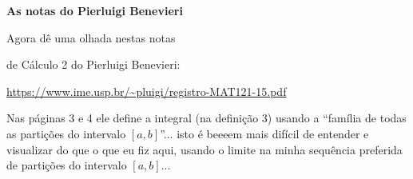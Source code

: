 \documentclass[oneside,12pt]{article}
\begin{document}
\newpage


{\bf As notas do Pierluigi Benevieri}

\ssk

Agora dê uma olhada nestas notas

de Cálculo 2 do Pierluigi Benevieri:

\ssk

\url{https://www.ime.usp.br/~pluigi/registro-MAT121-15.pdf}

\ssk

Nas páginas 3 e 4 ele define a integral (na definição 3) usando a
``família de todas as partições do intervalo $[a,b]$''... isto é
beeeem mais difícil de entender e visualizar do que o que eu fiz aqui,
usando o limite na minha sequência preferida de partições do intervalo
$[a,b]$...

\newpage

% 
% 
% 
% 
% 
% 
% 
% 






% 
% 
% 
% 
% 
% 
% 
% 
% 
% 
% 
\end{document}
